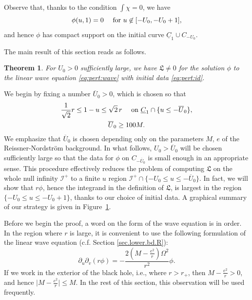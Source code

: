 \documentclass[12 pt, reqno]{amsart}
\newtheorem{theorem}{Theorem}[section]
\theoremstyle{definition}
\theoremstyle{remark}
\numberwithin{equation}{section}
\newcommand{\abs}[1]{\vert#1\vert}
\newcommand{\set}[1]{\{#1\}}
\newcommand{\rd}{\partial}
\newcommand{\0}{\emptyset}
\newcommand{\Omg}{\Omega}
\newcommand{\calI}{\mathcal I}
\newcommand{\uC}{\underline{C}}
\newcommand{\Ufree}{U_{0}}
\newcommand{\Ufixed}{\overline{U}_{0}}
\begin{document}
Observe that, thanks to the condition $\int \chi = 0$, we have
\begin{equation*}
	\phi(u, 1) = 0 \quad \hbox{ for } u \not \in [-\Ufree, -\Ufree + 1],
\end{equation*}
and hence $\phi$ has compact support on the initial curve $\uC_{1} \cup C_{-\Ufree}$.

The main result of this section reads as follows.
\begin{theorem} \label{thm:pert}
For $\Ufree > 0$ sufficiently large, we have $\mathfrak{L} \neq 0$ for the solution $\phi$ to the linear wave equation \eqref{eq:pert:wave} with initial data \eqref{eq:pert:id}.
\end{theorem}

We begin by fixing a number $\Ufixed > 0$, which is chosen so that
\begin{equation} \label{eq:pert:cond4U0}
\begin{gathered}
	\frac{1}{\sqrt{2}} r \leq 1 - u \leq \sqrt{2} \, r \quad \hbox{ on } \uC_{1} \cap \set{u \leq - \Ufixed}, \\
	\Ufixed \geq 100 M.
\end{gathered}
\end{equation}
We emphasize that $\Ufixed$ is chosen depending only on the parameters $M$, $e$ of the Reissner-Nordstr\"om background. In what follows, $\Ufree > \Ufixed$ will be chosen sufficiently large so that the data for $\phi$ on $C_{-\Ufixed}$ is small enough in an appropriate sense. This procedure effectively reduces the problem of computing $\mathfrak{L}$ on the whole null infinity $\calI^{+}$ to a finite $u$ region $\calI^{+} \cap \set{-\Ufree \leq u \leq -\Ufixed}$. In fact, we will show that $r \phi$, hence the integrand in the definition of  $\mathfrak{L}$, is largest in the region $\set{-\Ufree \leq u \leq -\Ufree+1}$, thanks to our choice of initial data. A graphical summary of our strategy is given in Figure~\ref{fig:pert}.

\begin{figure}[h]
\begin{center}
\def\svgwidth{220px}
 
\caption{} \label{fig:pert}
\end{center}
\end{figure}

Before we begin the proof, a word on the form of the wave equation is in order. In the region where $r$ is large, it is convenient to use the following formulation of the linear wave equation (c.f. Section \ref{sec.lower.bd.R}):
\begin{equation} \label{eq:pert:wave}
	\rd_{u} \rd_{v} (r \phi) = - \frac{2 (M - \frac{e^{2}}{r}) \Omg^2}{r^{2}} \phi.
\end{equation}
If we work in the exterior of the black hole, i.e., where $r > r_{+}$, then $M - \frac{e^{2}}{r} > 0$, and hence $\abs{M - \frac{e^{2}}{r}} \leq M$. In the rest of this section, this observation will be used frequently.
\end{document}
